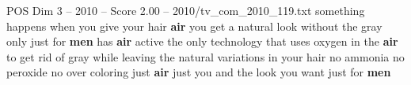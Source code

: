 \begin{textsample}{POS Dim 3 – 2010 – Score 2.00 – 2010/tv\_com\_2010\_119.txt}  \label{ex:f3_pos_045}
something happens when you give your hair \textbf{air} you get a natural look without the gray only just for \textbf{men} has \textbf{air} active the only technology that uses oxygen in the \textbf{air} to get rid of gray while leaving the natural variations in your hair no ammonia no peroxide no over coloring just \textbf{air} just you and the look you want just for \textbf{men}

\end{textsample}
